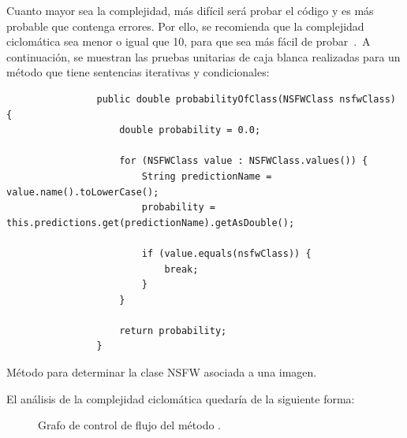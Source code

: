 Cuanto mayor sea la complejidad, más difícil será probar el código y es más probable que contenga errores.
Por ello, se recomienda que la complejidad ciclomática sea menor o igual que 10, para que sea más fácil de
probar~\cite{Cyclomat84:online}.\ A continuación, se muestran las pruebas unitarias de caja blanca
realizadas para un método que tiene sentencias iterativas y condicionales:

\begin{codeBlock}
	\begin{verbatim}
				public double probabilityOfClass(NSFWClass nsfwClass) {
					double probability = 0.0;

					for (NSFWClass value : NSFWClass.values()) {
						String predictionName = value.name().toLowerCase();
						probability = this.predictions.get(predictionName).getAsDouble();

						if (value.equals(nsfwClass)) {
							break;
						}
					}

					return probability;
				}
	\end{verbatim}
	\caption{Método para determinar la clase NSFW asociada a una imagen.}
\end{codeBlock}
\label{cod:codigo-pruebas-unitarias-caja-blanca}

El análisis de la complejidad ciclomática quedaría de la siguiente forma:

\begin{figure}[H]
	\centering
	\caption{Grafo de control de flujo del método .}
	\label{fig:grafo-control-flujo-pruebas-unitarias-caja-blanca}
\end{figure}

